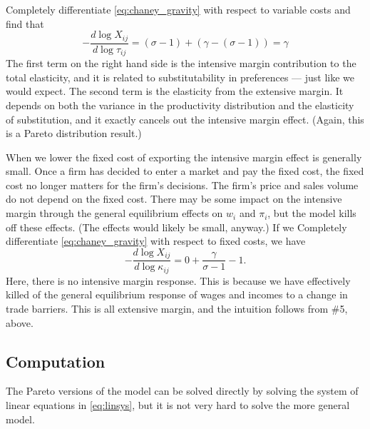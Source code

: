 \documentclass[11pt, pdftex]{article}
\begin{document}
Completely differentiate \eqref{eq:chaney_gravity} with respect to variable costs and find that
\begin{equation}
    -\frac{d \log X_{ij}}{d \log \tau_{ij} } = \left(\sigma -1  \right) + \left(\gamma - \left(\sigma-1 \right) \right) = \gamma
\end{equation}
The first term on the right hand side is the intensive margin contribution to the total elasticity, and it is related to substitutability in preferences --- just like we would expect.  The second term is the elasticity from the extensive margin.  It depends on both the variance in the productivity distribution and the elasticity of substitution, and it exactly cancels out the intensive margin effect. (Again, this is a Pareto distribution result.)

When we lower the fixed cost of exporting the intensive margin effect is generally small.  Once a firm has decided to enter a market and pay the fixed cost, the fixed cost no longer matters for the firm's decisions.  The firm's price and sales volume do not depend on the fixed cost. There may be some impact on the intensive margin through the general equilibrium effects on $w_i$ and $\pi_i$, but the \citet{chaney08} model kills off these effects. (The effects would likely be small, anyway.)  If we Completely differentiate \eqref{eq:chaney_gravity} with respect to fixed costs, we have
\begin{equation}
    -\frac{d \log X_{ij}}{d \log \kappa_{ij} } = 0 + \frac{\gamma}{\sigma-1}-1.
\end{equation}
Here, there is no intensive margin response.  This is because we have effectively killed of the general equilibrium response of wages and incomes to a change in trade barriers.  This is all extensive margin, and the intuition follows from \#5, above.


\subsection*{Computation}
The Pareto versions of the model can be solved directly by solving the system of linear equations in \eqref{eq:linsys}, but it is not very hard to solve the more general model.
\end{document}
